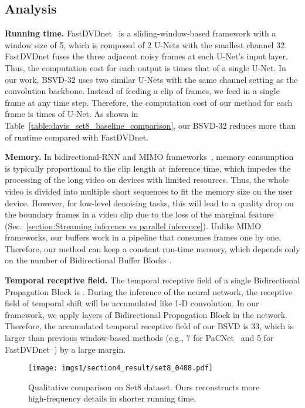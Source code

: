 \documentclass[sigconf]{acmart}
\begin{document}
\subsection{Analysis}
\textbf{Running time.}
FastDVDnet~\cite{Tassano2020FastDVDNet} is a sliding-window-based framework with a window size of 5, which is composed of 2 U-Nets with the smallest channel 32. FastDVDnet fuses the three adjacent noisy frames at each U-Net's input layer. Thus, the computation cost for each output is  times that of a single U-Net. In our work, BSVD-32 uses two similar U-Nets with the same channel setting as the convolution backbone. Instead of feeding a clip of frames, we feed in a single frame at any time step. Therefore, the computation cost of our method for each frame is  times of U-Net. As shown in Table~\ref{table:davis_set8_baseline_comparison}, our BSVD-32 reduces more than  of runtime compared with FastDVDnet.


\textbf{Memory.}
In bidirectional-RNN and MIMO frameworks~\cite{liang2022vrt,Xiang2022ReMoNet,chan2021basicvsr}, memory consumption is typically proportional to the clip length  at inference time, which impedes the processing of the long video on devices with limited resources. Thus, the whole video is divided into multiple short sequences to fit the memory size on the user device. 
However, for low-level denoising tasks, this will lead to a quality drop on the boundary frames in a video clip due to the loss of the marginal feature (Sec.~\ref{section:Streaming inference vs parallel inference}).
Unlike MIMO frameworks, our buffers work in a pipeline that consumes frames one by one. Therefore, our method can keep a constant run-time memory, which depends only on the number of Bidirectional Buffer Blocks .



\textbf{Temporal receptive field.}
The temporal receptive field of a single Bidirectional Propagation Block is .
During the inference of the neural network, the receptive field of temporal shift will be accumulated like 1-D convolution. 
In our framework, we apply  layers of Bidirectional Propagation Block in the network.
Therefore, the accumulated temporal receptive field of our BSVD is 33, which is larger than previous window-based methods (e.g., 7 for PaCNet~\cite{Vaksman2021Patch} and 5 for FastDVDnet~\cite{Tassano2020FastDVDNet}) by a large margin.




\begin{figure*}[t]
\centering
\vspace{-10pt}
\texttt{[image: imgs1/section4\_result/set8\_0408.pdf]}
\caption{Qualitative comparison on Set8 dataset. Ours reconstructs more high-frequency details in shorter running time.}
\label{fig:visual_set8}
\end{figure*}
\end{document}
